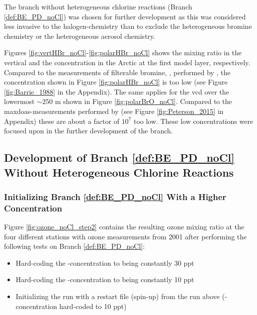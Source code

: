 \medskip

The branch without heterogeneous chlorine reactions (Branch \ref{def:BE_PD_noCl}) was chosen for further development as this was considered less invasive to the halogen-chemistry than to exclude the heterogeneous bromine chemistry or the heterogeneous aerosol chemistry. 

\medskip

Figures \ref{fig:vertHBr_noCl}-\ref{fig:polarHBr_noCl} shows the mixing ratio in the vertical and the concentration in the Arctic at the first model layer, respectively. Compared to the measurements of filterable bromine, , performed by \cite{barrie}, the concentration shown in Figure \ref{fig:polarHBr_noCl} is too low (see Figure \ref{fig:Barrie_1988} in the Appendix). The same applies for the  \acrshort{vcd} over the lowermost $\sim 250$ m shown in Figure \ref{fig:polarBrO_noCl}. Compared to the \acrshort{maxdoas}-measurements performed by \cite{Peterson2015} (see Figure \ref{fig:Peterson_2015} in Appendix) these are about a factor of $10^7$ too low. These low concentrations were focused upon in the further development of the branch. 



\subsection{Development of Branch \ref{def:BE_PD_noCl} Without Heterogeneous Chlorine Reactions}


\subsubsection{Initializing Branch \ref{def:BE_PD_noCl} With a Higher  Concentration}\label{sec:disc_step2}

Figure \ref{fig:ozone_noCl_step2} contains the resulting ozone mixing ratio at the four different stations with ozone measurements from 2001 after performing the following tests on Branch \ref{def:BE_PD_noCl}: 

\begin{itemize}
    \item Hard-coding the -concentration to being constantly 30 ppt 
    \item Hard-coding the -concentration to being constantly 10 ppt
    \item Initializing the run with a restart file (spin-up) from the run above (-concentration hard-coded to 10 ppt)
\end{itemize}

